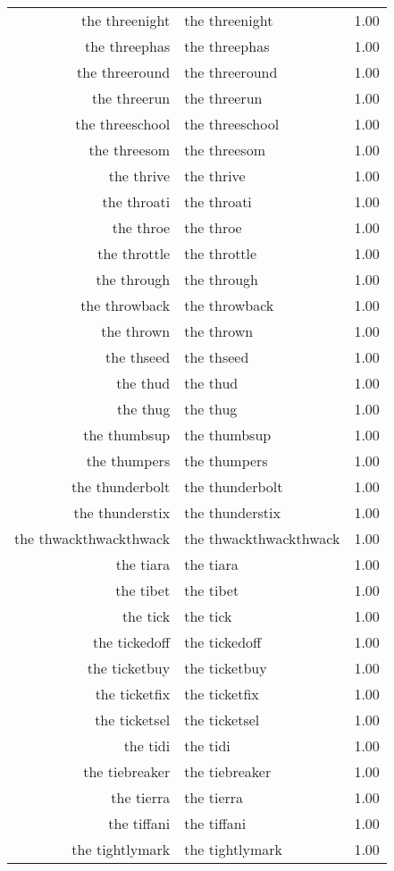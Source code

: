 \begin{table}[ht]
\begin{tabular}{rlr}
  the threenight & the threenight & 1.00 \\ 
  the threephas & the threephas & 1.00 \\ 
  the threeround & the threeround & 1.00 \\ 
  the threerun & the threerun & 1.00 \\ 
  the threeschool & the threeschool & 1.00 \\ 
  the threesom & the threesom & 1.00 \\ 
  the thrive & the thrive & 1.00 \\ 
  the throati & the throati & 1.00 \\ 
  the throe & the throe & 1.00 \\ 
  the throttle & the throttle & 1.00 \\ 
  the through & the through & 1.00 \\ 
  the throwback & the throwback & 1.00 \\ 
  the thrown & the thrown & 1.00 \\ 
  the thseed & the thseed & 1.00 \\ 
  the thud & the thud & 1.00 \\ 
  the thug & the thug & 1.00 \\ 
  the thumbsup & the thumbsup & 1.00 \\ 
  the thumpers & the thumpers & 1.00 \\ 
  the thunderbolt & the thunderbolt & 1.00 \\ 
  the thunderstix & the thunderstix & 1.00 \\ 
  the thwackthwackthwack & the thwackthwackthwack & 1.00 \\ 
  the tiara & the tiara & 1.00 \\ 
  the tibet & the tibet & 1.00 \\ 
  the tick & the tick & 1.00 \\ 
  the tickedoff & the tickedoff & 1.00 \\ 
  the ticketbuy & the ticketbuy & 1.00 \\ 
  the ticketfix & the ticketfix & 1.00 \\ 
  the ticketsel & the ticketsel & 1.00 \\ 
  the tidi & the tidi & 1.00 \\ 
  the tiebreaker & the tiebreaker & 1.00 \\ 
  the tierra & the tierra & 1.00 \\ 
  the tiffani & the tiffani & 1.00 \\ 
  the tightlymark & the tightlymark & 1.00 \\ 

\end{tabular}
\end{table}
